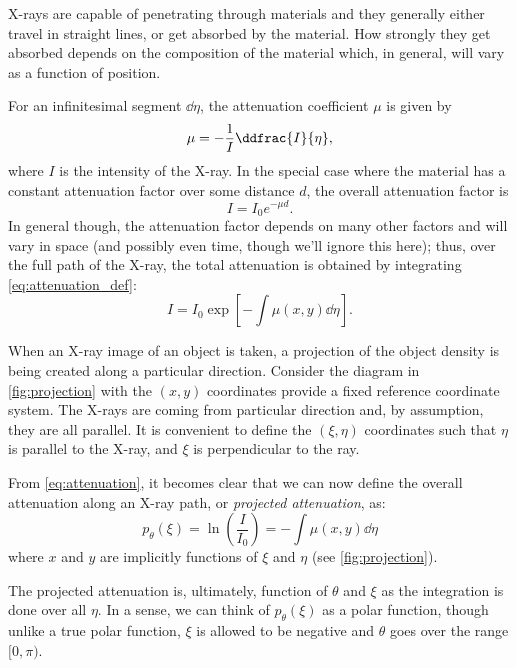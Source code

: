 \documentclass[
  a4paper,             %
  11pt,                %
  oneside,             %
  onecolumn,           %
  bibliography=totoc,  %
  final,               %
]{scrartcl}
\begin{document}
X-rays are capable of penetrating through materials and they generally either
travel in straight lines, or get absorbed by the material.  How strongly they
get absorbed depends on the composition of the material which, in general, will
vary as a function of position.

For an infinitesimal segment \(\dd \eta\), the attenuation coefficient \(\mu\)
is given by
\begin{equation}
  \label{eq:attenuation_def}
  \mu = - \frac{1}{I} \ddfrac{I}{\eta},
\end{equation}
where \(I\) is the intensity of the X-ray.  In the special case where the
material has a constant attenuation factor over some distance \(d\), the overall
attenuation factor is
\begin{equation}
  I = I_{0} e^{-\mu d}.
\end{equation}
In general though, the attenuation factor depends on many other factors and will
vary in space (and possibly even time, though we'll ignore this here); thus,
over the full path of the X-ray, the total attenuation is obtained by
integrating \cref{eq:attenuation_def}:
\begin{equation}
  \label{eq:attenuation}
  I = I_{0} \exp\left[ - \int \mu(x, y) \dd \eta \right].
\end{equation}

When an X-ray image of an object is taken, a projection of the object density is
being created along a particular direction.  Consider the diagram in
\cref{fig:projection} with the \((x, y)\) coordinates provide a fixed reference
coordinate system.  The X-rays are coming from particular direction and, by
assumption, they are all parallel.  It is convenient to define the \((\xi,
\eta)\) coordinates such that \(\eta\) is parallel to the X-ray, and \(\xi\) is
perpendicular to the ray.

From \cref{eq:attenuation}, it becomes clear that we can now define the overall
attenuation along an X-ray path, or \emph{projected attenuation}, as:
\begin{equation}
  \label{eq:projected_attenuation}
  p_{\theta}(\xi) = \ln\left( \frac{I}{I_{0}} \right) = - \int \mu(x, y) \dd \eta
\end{equation}
where \(x\) and \(y\) are implicitly functions of \(\xi\) and \(\eta\) (see
\cref{fig:projection}).

The projected attenuation is, ultimately, function of \(\theta\) and \(\xi\) as
the integration is done over all \(\eta\).  In a sense, we can think of
\(p_{\theta}(\xi)\) as a polar function, though unlike a true polar function,
\(\xi\) is allowed to be negative and \(\theta\) goes over the range \([0,
\pi)\).
\end{document}

